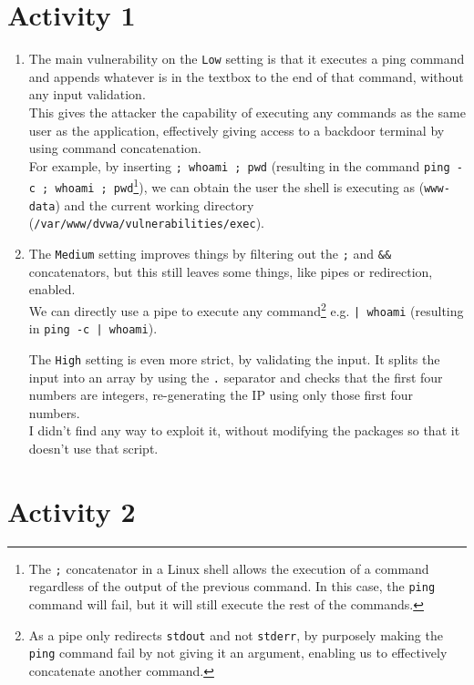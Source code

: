 \section*{Activity 1}

\begin{enumerate}

    \item The main vulnerability on the \texttt{Low} setting is that it executes a ping command and appends whatever is in the textbox to the end of that command, without any input validation.\\
    This gives the attacker the capability of executing any commands as the same user as the application, effectively giving access to a backdoor terminal by using command concatenation.\\
    For example, by inserting \texttt{; whoami ; pwd} (resulting in the command \texttt{ping -c ; whoami ; pwd}\footnote{The \texttt{;} concatenator in a Linux shell allows the execution of a command regardless of the output of the previous command. In this case, the \texttt{ping} command will fail, but it will still execute the rest of the commands.}), we can obtain the user the shell is executing as (\texttt{www-data}) and the current working directory (\texttt{/var/www/dvwa/vulnerabilities/exec}).
    \item The \texttt{Medium} setting improves things by filtering out the \texttt{;} and \texttt{\&\&} concatenators, but this still leaves some things, like pipes or redirection, enabled.\\
    We can directly use a pipe to execute any command\footnote{As a pipe only redirects \texttt{stdout} and not \texttt{stderr}, by purposely making the \texttt{ping} command fail by not giving it an argument, enabling us to effectively concatenate another command.} e.g. \texttt{| whoami} (resulting in \texttt{ping -c | whoami}).\newline
    
    The \texttt{High} setting is even more strict, by validating the input. It splits the input into an array by using the \texttt{.} separator and checks that the first four numbers are integers, re-generating the IP using only those first four numbers.\\
    I didn't find any way to exploit it, without modifying the packages so that it doesn't use that script.
    
\end{enumerate}


\section*{Activity 2}

